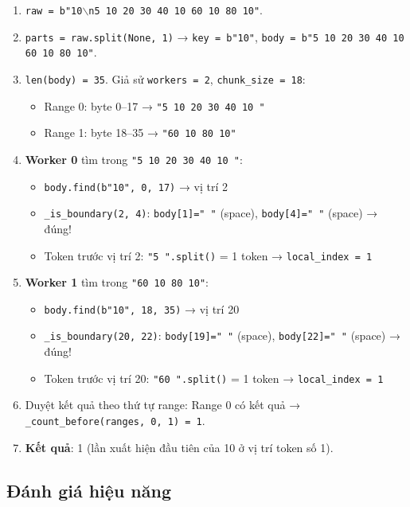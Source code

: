 \documentclass[12pt,a4paper]{article}
\begin{document}
\begin{enumerate}
  \item \texttt{raw = b"10$\backslash$n5 10 20 30 40 10 60 10 80 10"}.
  \item \texttt{parts = raw.split(None, 1)} → \texttt{key = b"10"}, \texttt{body = b"5 10 20 30 40 10 60 10 80 10"}.
  \item \texttt{len(body) = 35}. Giả sử \texttt{workers = 2}, \texttt{chunk\_size = 18}:
    \begin{itemize}
      \item Range 0: byte 0–17 → \texttt{"5 10 20 30 40 10 "}
      \item Range 1: byte 18–35 → \texttt{"60 10 80 10"}
    \end{itemize}
  \item \textbf{Worker 0} tìm trong \texttt{"5 10 20 30 40 10 "}:
    \begin{itemize}
      \item \texttt{body.find(b"10", 0, 17)} → vị trí 2
      \item \texttt{\_is\_boundary(2, 4)}: \texttt{body[1]=" "} (space), \texttt{body[4]=" "} (space) → đúng!
      \item Token trước vị trí 2: \texttt{"5 ".split()} = 1 token → \texttt{local\_index = 1}
    \end{itemize}
  \item \textbf{Worker 1} tìm trong \texttt{"60 10 80 10"}:
    \begin{itemize}
      \item \texttt{body.find(b"10", 18, 35)} → vị trí 20
      \item \texttt{\_is\_boundary(20, 22)}: \texttt{body[19]=" "} (space), \texttt{body[22]=" "} (space) → đúng!
      \item Token trước vị trí 20: \texttt{"60 ".split()} = 1 token → \texttt{local\_index = 1}
    \end{itemize}
  \item Duyệt kết quả theo thứ tự range: Range 0 có kết quả → \texttt{\_count\_before(ranges, 0, 1) = 1}.
  \item \textbf{Kết quả}: 1 (lần xuất hiện đầu tiên của 10 ở vị trí token số 1).
\end{enumerate}

\subsection{Đánh giá hiệu năng}
\end{document}
